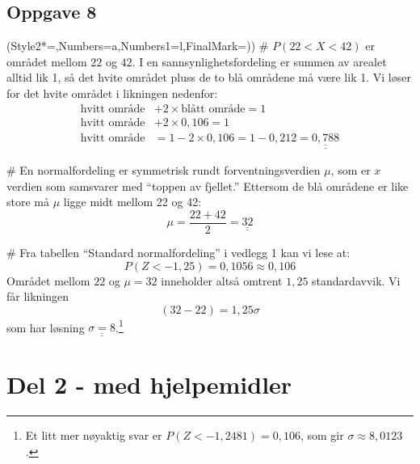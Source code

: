 \documentclass[12pt, a4paper]
{article}						%
\def\answer#1{\underline{\underline{#1}}}
\begin{document}
\subsection*{Oppgave 8}
\begin{easylist}[enumerate]
	\ListProperties(Style2*=,Numbers=a,Numbers1=l,FinalMark={)})
	# $P(22 < X < 42)$ er området mellom $22$ og $42$. I en sannsynlighetsfordeling er summen av arealet alltid lik 1, så det hvite området pluss de to blå områdene må være lik 1. Vi løser for det hvite området i likningen nedenfor:
	\begin{align*}
		\text{hvitt område} &+ 2 \times \text{blått område} = 1 \\
		\text{hvitt område} &+ 2 \times 0,106 = 1 \\
		\text{hvitt område} &= 1 - 2 \times 0,106 = 1-0,212 = \answer{0,788 }
	\end{align*}
	
	# En normalfordeling er symmetrisk rundt forventningsverdien $\mu$, som er $x$ verdien som samsvarer med ``toppen av fjellet.'' Ettersom de blå områdene er like store må $\mu$ ligge midt mellom 22 og 42:
	\begin{equation*}
		\mu = \frac{22 + 42}{2} = \answer{32}
	\end{equation*}
	
	# Fra tabellen ``Standard normalfordeling'' i vedlegg 1 kan vi lese at:
	\begin{equation*}
		P(Z < -1,25) = 0,1056 \approx 0,106
	\end{equation*}
	Området mellom $22$ og $\mu = 32$ inneholder altså omtrent $1,25$ standardavvik. Vi får likningen
	\begin{equation*}
		(32-22) = 1,25 \sigma 
	\end{equation*}
	som har løsning $\answer{\sigma = 8}$.\footnote{Et litt mer nøyaktig svar er $P(Z < -1,2481) = 0,106$, som gir $\sigma \approx 8,0123$.}
\end{easylist}




\section*{Del 2 - med hjelpemidler}
\end{document}
